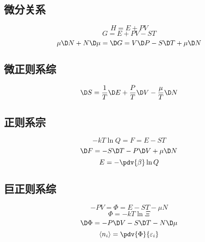 
\subsection{微分关系}
\begin{equation}
H = E + PV
\end{equation}
\begin{equation}
G = E + PV - ST
\end{equation}
\begin{equation}
\mu  \D N + N \D \mu  =  \D G = V \D P - S \D T + \mu  \D N
\end{equation}
\subsection{微正则系综}
\begin{equation}
\D S = \frac{1}{T} \D E + \frac{P}{T} \D V - \frac{\mu }{T} \D N
\end{equation}
\subsection{正则系宗}
\begin{equation}
- kT\ln Q = F = E - ST
\end{equation}
\begin{equation}
\D F =  - S \D T - P \D V + \mu  \D N
\end{equation}
\begin{equation}
E =  - \pdv{\beta} \ln Q
\end{equation}
\subsection{巨正则系综}
\begin{equation}
- PV = \Phi  = E - ST - \mu N
\end{equation}
\begin{equation}
\Phi  =  - kT\ln \Xi 
\end{equation}
\begin{equation}
\D \Phi  =  - P \D V - S \D T - N \D \mu
\end{equation}
\begin{equation}
\left\langle {n_i} \right\rangle  = \pdv{\Phi}{\varepsilon_i}
\end{equation}
